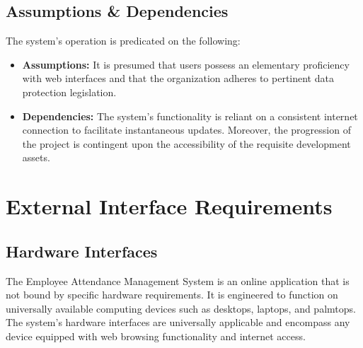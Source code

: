 \documentclass[a4paper, 12pt]{article}
\begin{document}
\subsection{Assumptions \& Dependencies}
The system’s operation is predicated on the following:
\begin{itemize}
    \item \textbf{Assumptions:} It is presumed that users possess an elementary proficiency with web interfaces and that the organization adheres to pertinent data protection legislation.
    \item \textbf{Dependencies:} The system’s functionality is reliant on a consistent internet connection to facilitate instantaneous updates. Moreover, the progression of the project is contingent upon the accessibility of the requisite development assets.
\end{itemize}

\newpage
\section{External Interface Requirements}
\subsection{Hardware Interfaces}
The Employee Attendance Management System is an online application that is not bound by specific hardware requirements. It is engineered to function on universally available computing devices such as desktops, laptops, and palmtops. The system’s hardware interfaces are universally applicable and encompass any device equipped with web browsing functionality and internet access.
\end{document}
